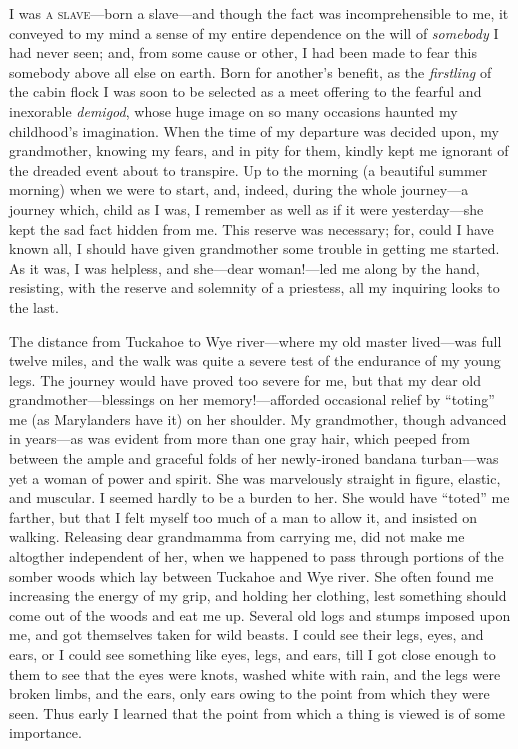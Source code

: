 I was \textsc{a slave}---born a slave---and though the fact was
incomprehensible to me, it conveyed to my mind a sense of my entire
dependence on the will of \emph{somebody} I had never seen; and, from
some cause or other, I had been made to fear this somebody above all
else on earth. Born for another's benefit, as the \emph{firstling} of
the cabin flock I was soon to be selected as a meet offering to the
fearful and inexorable \emph{demigod}, whose huge image on so many
occasions haunted my childhood's imagination. When the time of my
departure was decided upon, my grandmother, knowing my fears, and in
pity for them, kindly kept me ignorant of the dreaded event about to
transpire. Up to the morning (a beautiful summer morning) when we were
to start, and, indeed, during the whole journey---a journey which, child
as I was, I remember as well as if it were yesterday---she kept the sad
fact {\protect\hypertarget{46}{}{}}hidden from me. This reserve was
necessary; for, could I have known all, I should have given grandmother
some trouble in getting me started. As it was, I was helpless, and
she---dear woman!---led me along by the hand, resisting, with the
reserve and solemnity of a priestess, all my inquiring looks to the
last.

The distance from Tuckahoe to Wye river---where my old master
lived---was full twelve miles, and the walk was quite a severe test of
the endurance of my young legs. The journey would have proved too severe
for me, but that my dear old grandmother---blessings on her
memory!---afforded occasional relief by ``toting'' me (as Marylanders
have it) on her shoulder. My grandmother, though advanced in years---as
was evident from more than one gray hair, which peeped from between the
ample and graceful folds of her newly-ironed bandana turban---was yet a
woman of power and spirit. She was marvelously straight in figure,
elastic, and muscular. I seemed hardly to be a burden to her. She would
have ``toted'' me farther, but that I felt myself too much of a man to
allow it, and insisted on walking. Releasing dear grandmamma from
carrying me, did not make me {altogther} independent of her, when we
happened to pass through portions of the somber woods which lay between
Tuckahoe and Wye river. She often found me increasing the energy of my
grip, and holding her clothing, lest something should come out of the
woods and eat me up. Several old logs and stumps imposed upon me, and
got themselves taken for wild beasts. I could see their legs, eyes, and
ears, {\protect\hypertarget{47}{}{}}or I could see something like eyes,
legs, and ears, till I got close enough to them to see that the eyes
were knots, washed white with rain, and the legs were broken limbs, and
the ears, only ears owing to the point from which they were seen. Thus
early I learned that the point from which a thing is viewed is of some
importance.


